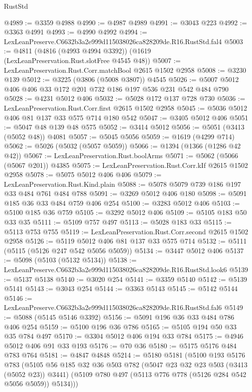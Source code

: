 \begin{lexlean}{RustStd}
\begin{coremodule}
@4989 := @3359 @4988
@4990 := @4987 @4989
@4991 := @3043 @223
@4992 := @3363 @4991
@4993 := @4990 @4992
@4994 := LexLeanPreserve.C6632b3a2e999d115038026ca828209de.R16.RustStd.fal4
@5003 := @4811 (@4816 (@4993 @4994 @3392)) (@1619 (LexLeanPreservation.Rust.slotFree @4545 @48))
@5007 := LexLeanPreservation.Rust.Corr.matchBool @2615 @1502 @2958
@5008 := @3230 @139
@5012 := @3225 (@3806 (@5008 @3807)) @4545
@5026 := @5007 @5012 @406 @406 @33 @172 @201 @732 @186 @197 @536 @231 @542 @484 @790
@5028 := @4231 @5012 @406
@5032 := @5028 @172 @137 @728 @730
@5036 := LexLeanPreservation.Rust.Corr.first @2615 @1502 @2958
@5045 := @5036 @5012 @406 @81 @137 @33 @575 @714 @180 @542
@5047 := @3405 @5012 @406
@5051 := @5047 @48 @139 @48 @575
@5052 := @3414 @5012
@5056 := @5051 (@3413 (@5052 @48)) @4081
@5057 := @5045 @5056
@5059 := @1619 (@4299 @714)
@5062 := @5026 (@5032 (@5057 @5059))
@5066 := @1394 (@1366 (@1286 @42 @42))
@5067 := LexLeanPreservation.Rust.boolArms
@5071 := @5062 (@5066 (@5067 @201)) @4385
@5075 := LexLeanPreservation.Rust.Corr.kIf @2615 @1502 @2958
@5078 := @5075 @5012 @406 @406
@5079 := LexLeanPreservation.Rust.Kind.plain
@5088 := @5078 @5079 @739 @186 @197 @33 @484 @761 @484 @788
@5091 := @3269 @5012 @406 @180
@5098 := @5091 @185 @36 @33 @484 @759 @406 @254
@5100 := @3283 @5012 @406
@5103 := @5100 @185 @36 @759
@5105 := @3292 @5012 @406
@5109 := @5105 @183 @50 @33 @35
@5111 := @5109 @757 @497
@5113 := @5028 @183 @33
@5115 := @5113 @753 @755
@5119 := LexLeanPreservation.Rust.Corr.second @2615 @1502 @2958
@5126 := @5119 @5012 @406 @81 @137 @33 @575 @714
@5132 := @5111 (@5115 (@5126 @247 @542 @5056 @5059))
@5134 := @3447 @5012 @406
@5137 := @5098 (@5103 (@5132 @5134))
@5138 := LexLeanPreserve.C6632b3a2e999d115038026ca828209de.R16.RustStd.look6
@5139 := @5137 @5138
@5140 := @3020 @254
@5141 := @3359 @5140
@5142 := @5139 @5141
@5143 := @3043 @254
@5144 := @3363 @5143
@5145 := @5142 @5144
@5146 := LexLeanPreserve.C6632b3a2e999d115038026ca828209de.R16.RustStd.fal6
@5149 := @5088 (@5145 @5146 @3392)
@5156 := @5091 @196 @36 @33 @484 @786 @406 @254
@5159 := @5100 @196 @36 @786
@5165 := @5105 @194 @50 @33 @35 @784 @497
@5170 := @3304 @5012 @406 @194 @33 @784
@5175 := @4946 @5012 @406 @91 @33 @193
@5176 := @70 @36
@5180 := @5175 @5176 @484 @783 @764
@5181 := @4847 @4848
@5214 := @5180
    @5181
    (@5100
      @193
      @5176
      @783
      (@5105
        @56
        @185
        @32
        @36
        @503
        @782
        (@5047 @23 @32 @23 @503 (@3413 (@5052 @23)) @3441)
        (@5109 @780 @497 (@5113 @776 @778 (@5126 @284 @542 @5056 @5059)) @5134)))

\end{coremodule}
\end{lexlean}

